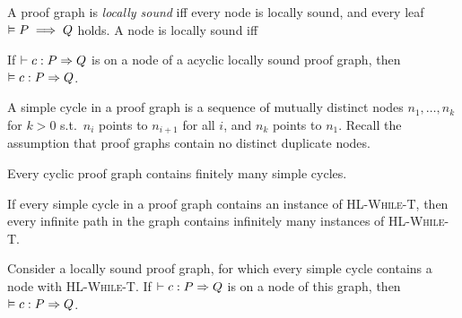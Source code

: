 \begin{definition}
    A proof graph is \emph{locally sound} iff every node is locally sound,
    and every leaf $\vDash P \implies Q$ holds.
    A node is locally sound iff 
\end{definition}

\begin{conjecture}
    If $\DER \Triple c : P => Q$ is on a node of a
    acyclic locally sound proof graph,
    then $\VAL \Triple c : P => Q$.
\end{conjecture}

\begin{definition}
    A simple cycle in a proof graph is a sequence of mutually distinct nodes $n_1,\dots,n_k$ for $k > 0$
    s.t.\ $n_i$ points to $n_{i+1}$ for all $i$, and $n_k$ points to $n_1$.
    Recall the assumption that proof graphs contain no distinct duplicate nodes.
\end{definition}

\begin{conjecture}
    Every cyclic proof graph contains finitely many simple cycles.
\end{conjecture}


\begin{conjecture}
    If every simple cycle in a proof graph
    contains an instance of \textsc{HL-While-T},
    then every infinite path in the graph
    contains infinitely many instances of \textsc{HL-While-T}.
\end{conjecture}

\begin{conjecture}
    Consider a locally sound proof graph,
    for which every simple cycle contains a node
    with \textsc{HL-While-T}.
    If $\DER \Triple c : P => Q$ is on a node of this graph,
    then $\VAL \Triple c : P => Q$.
\end{conjecture}



